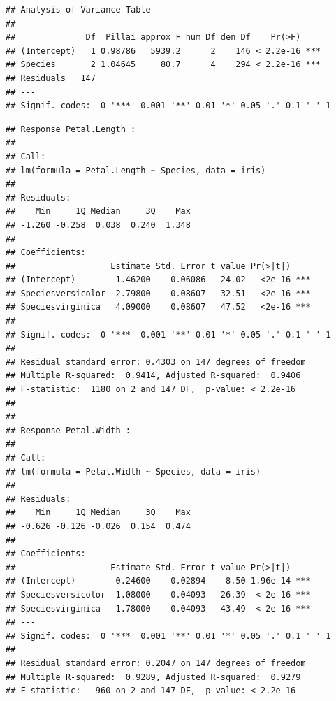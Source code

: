 \documentclass[krantz2]{krantz}\usepackage{knitr}
\begin{document}
\begin{knitrout}\footnotesize
{}\color{fgcolor}\begin{kframe}
\begin{alltt}
 \hlkwb{<-} \hlstd{(} \hlopt{~}    
\end{alltt}
\begin{verbatim}
## Analysis of Variance Table
## 
##              Df  Pillai approx F num Df den Df    Pr(>F)    
## (Intercept)   1 0.98786   5939.2      2    146 < 2.2e-16 ***
## Species       2 1.04645     80.7      4    294 < 2.2e-16 ***
## Residuals   147                                             
## ---
## Signif. codes:  0 '***' 0.001 '**' 0.01 '*' 0.05 '.' 0.1 ' ' 1
\end{verbatim}
\begin{alltt}
\end{alltt}
\begin{verbatim}
## Response Petal.Length :
## 
## Call:
## lm(formula = Petal.Length ~ Species, data = iris)
## 
## Residuals:
##    Min     1Q Median     3Q    Max 
## -1.260 -0.258  0.038  0.240  1.348 
## 
## Coefficients:
##                   Estimate Std. Error t value Pr(>|t|)    
## (Intercept)        1.46200    0.06086   24.02   <2e-16 ***
## Speciesversicolor  2.79800    0.08607   32.51   <2e-16 ***
## Speciesvirginica   4.09000    0.08607   47.52   <2e-16 ***
## ---
## Signif. codes:  0 '***' 0.001 '**' 0.01 '*' 0.05 '.' 0.1 ' ' 1
## 
## Residual standard error: 0.4303 on 147 degrees of freedom
## Multiple R-squared:  0.9414,	Adjusted R-squared:  0.9406 
## F-statistic:  1180 on 2 and 147 DF,  p-value: < 2.2e-16
## 
## 
## Response Petal.Width :
## 
## Call:
## lm(formula = Petal.Width ~ Species, data = iris)
## 
## Residuals:
##    Min     1Q Median     3Q    Max 
## -0.626 -0.126 -0.026  0.154  0.474 
## 
## Coefficients:
##                   Estimate Std. Error t value Pr(>|t|)    
## (Intercept)        0.24600    0.02894    8.50 1.96e-14 ***
## Speciesversicolor  1.08000    0.04093   26.39  < 2e-16 ***
## Speciesvirginica   1.78000    0.04093   43.49  < 2e-16 ***
## ---
## Signif. codes:  0 '***' 0.001 '**' 0.01 '*' 0.05 '.' 0.1 ' ' 1
## 
## Residual standard error: 0.2047 on 147 degrees of freedom
## Multiple R-squared:  0.9289,	Adjusted R-squared:  0.9279 
## F-statistic:   960 on 2 and 147 DF,  p-value: < 2.2e-16
\end{verbatim}
\end{kframe}
\end{knitrout}
\end{document}
